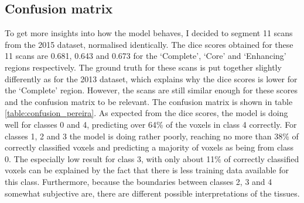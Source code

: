 \documentclass[12pt,a4paper,twoside,openright]{report}
\newlength\figureheight
\newlength\figurewidth
\begin{document}
%
%	


\subsection{Confusion matrix}
To get more insights into how the model behaves, I decided to segment 11 scans from the 2015 dataset, normalised identically. The dice scores obtained for these 11 scans are 0.681, 0.643 and 0.673 for the `Complete', `Core' and `Enhancing' regions respectively. The ground truth for these scans is put together slightly differently as for the 2013 dataset, which explains why the dice scores is lower for the `Complete' region. However, the scans are still similar enough for these scores and the confusion matrix to be relevant. The confusion matrix is shown in table \ref{table:confusion_pereira}. As expected from the dice scores, the model is doing well for classes 0 and 4, predicting over 64\% of the voxels in class 4 correctly. For classes 1, 2 and 3 the model is doing rather poorly, reaching no more than 38\% of correctly classified voxels and predicting a majority of voxels as being from class 0. The especially low result for class 3, with only about 11\% of correctly classified voxels can be explained by the fact that there is less training data available for this class. Furthermore, because the boundaries between classes 2, 3 and 4 somewhat subjective are, there are different possible interpretations of the tissues.
\end{document}
